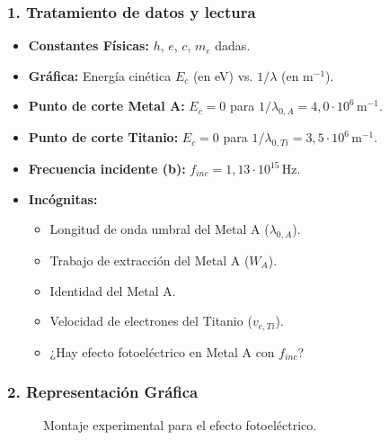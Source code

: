 \subsubsection*{1. Tratamiento de datos y lectura}
\begin{itemize}
    \item \textbf{Constantes Físicas:} $h$, $e$, $c$, $m_e$ dadas.
    \item \textbf{Gráfica:} Energía cinética $E_c$ (en eV) vs. $1/\lambda$ (en m$^{-1}$).
    \item \textbf{Punto de corte Metal A:} $E_c=0$ para $1/\lambda_{0,A} = 4,0 \cdot 10^6 \, \text{m}^{-1}$.
    \item \textbf{Punto de corte Titanio:} $E_c=0$ para $1/\lambda_{0,Ti} = 3,5 \cdot 10^6 \, \text{m}^{-1}$.
    \item \textbf{Frecuencia incidente (b):} $f_{inc} = 1,13 \cdot 10^{15} \, \text{Hz}$.
    \item \textbf{Incógnitas:}
    \begin{itemize}
        \item Longitud de onda umbral del Metal A ($\lambda_{0,A}$).
        \item Trabajo de extracción del Metal A ($W_A$).
        \item Identidad del Metal A.
        \item Velocidad de electrones del Titanio ($v_{e,Ti}$).
        \item ¿Hay efecto fotoeléctrico en Metal A con $f_{inc}$?
    \end{itemize}
\end{itemize}

\subsubsection*{2. Representación Gráfica}
\begin{figure}[H]
    \centering
    \caption{Montaje experimental para el efecto fotoeléctrico.}
\end{figure}

